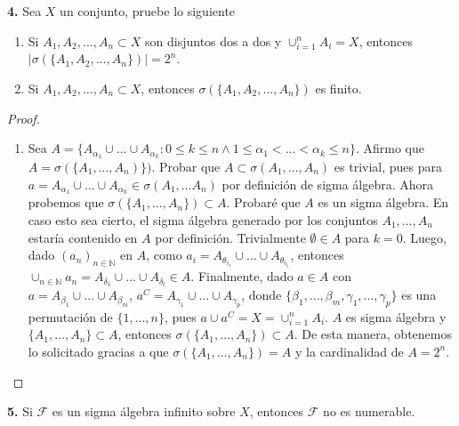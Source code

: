 \documentclass{article}
\newenvironment{statement}[1]{\smallskip\noindent\color[rgb]{1.00,0.00,0.50} {\bf #1.}}{}
\theoremstyle{definition}
\theoremstyle{remark}
\newcommand{\BN}{\mathbb N}
\begin{document}
\begin{statement}{4}
  Sea $X$ un conjunto, pruebe lo siguiente
  \begin{enumerate}
    \item Si $A_1, A_2, \dots, A_n \subset X$ son disjuntos dos a dos y $\cup_{i = 1}^n A_i = X$, entonces $|\sigma(\{A_1, A_2, \dots, A_n\})| = 2^n$.
    \item Si $A_1, A_2, \dots, A_n \subset X$, entonces $\sigma(\{A_1, A_2, \dots, A_n\})$ es finito.
  \end{enumerate}
\end{statement}

\begin{proof}
  \begin{enumerate}
    \item Sea $A = \{A_{\alpha_1} \cup \dots \cup A_{\alpha_k} : 0 \leq k \leq n \land 1 \leq \alpha_1 < \dots < \alpha_k \leq n\}$. Afirmo que $A = \sigma(\{A_1, \dots, A_n)\})$.
      Probar que $A \subset \sigma(A_1, \dots, A_n)$ es trivial, pues para $a = A_{\alpha_1} \cup \dots \cup A_{\alpha_k} \in \sigma(A_1, \dots A_n)$ por definici\'on de sigma \'algebra.
      Ahora probemos que $\sigma(\{A_1, \dots, A_n\}) \subset A$.
      Probar\'e que $A$ es un sigma \'algebra. En caso esto sea cierto, el sigma \'algebra generado por los conjuntos $A_1, \dots, A_n$ estar\'ia contenido en $A$ por definici\'on.
      Trivialmente $\emptyset \in A$ para $k = 0$.
      Luego, dado $(a_n)_{n \in \BN}$ en $A$, como $a_i = A_{\theta_{i_1}} \cup \dots \cup A_{\theta_{i_{l_i}}}$, entonces $\cup_{n \in \BN} a_n = A_{\delta_1} \cup \dots \cup A_{\delta_l} \in A$.
      Finalmente, dado $a \in A$ con $a = A_{\beta_1} \cup \dots \cup A_{\beta_m}$, $a^C = A_{\gamma_1} \cup \dots \cup A_{\gamma_p}$, donde $\{\beta_1, \dots, \beta_m, \gamma_1, \dots, \gamma_p\}$ es una permutaci\'on de $\{1, \dots, n\}$, pues $a \cup a^C = X = \cup_{i = 1}^n A_i$.
      $A$ es sigma \'algebra y $\{A_1, \dots, A_n\} \subset A$, entonces $\sigma(\{A_1, \dots, A_n\}) \subset A$.
      De esta manera, obtenemos lo solicitado gracias a que $\sigma(\{A_1, \dots, A_n\}) = A$ y la cardinalidad de $A = 2^n$.
  \end{enumerate}
\end{proof}

\begin{statement}{5}
  Si $\mathcal{F}$ es un sigma \'algebra infinito sobre $X$, entonces $\mathcal{F}$ no es numerable.
\end{statement}
\end{document}
